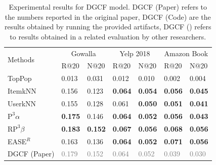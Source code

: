 \documentclass[sigconf,natbib=true,nonacm]{acmart}
\newcommand{\palpha}{\ensuremath{\text{P}^3\!\alpha}\xspace}
\newcommand{\pbeta}{\ensuremath{\text{RP}^3\!\beta}\xspace}
\newcommand{\easer}{EASE$^R$\xspace}
\begin{document}
\begin{table}[htbp]
\addtolength{\tabcolsep}{-0.1em}
    \caption{Experimental results for DGCF model. DGCF (Paper) refers to the numbers reported in the original paper, DGCF (Code) are the results obtained by running the provided artifacts, DGCF (\cite{Anelli2023Myth}) refers to results obtained in a related evaluation by other researchers.}
    \label{tab:tDGCF}
    \centering
    \begin{tabular}{l l l l l l l}

        \multirow{2}{*}{Methods} & \multicolumn{2}{c}{Gowalla}                              & \multicolumn{2}{c}{Yelp 2018}                                 & \multicolumn{2}{c}{Amazon Book} \\

        ~                       & R@20               & N@20                                 & R@20                  & N@20                            & R@20                    & N@20 \\ \hline
        TopPop                  & 0.013              & 0.031                                & 0.012                 & 0.010                           & 0.002                   &   0.004         \\
        ItemkNN                 & 0.156              & 0.123                                & \textbf{0.064}        & \textbf{0.054}                  & \textbf{0.056}          & \textbf{0.045}            \\
        UserkNN                 & 0.155              & 0.128                                &  0.061                & \textbf{0.050}                  & \textbf{0.051}          & \textbf{0.041}             \\
        \palpha                 & \textbf{0.175}     & 0.146                                & \textbf{0.064}        & \textbf{0.052}                  & \textbf{0.056}          & \textbf{0.043}           \\
        \pbeta                  & \textbf{0.183}     & \textbf{0.152}                       & \textbf{0.067}        & \textbf{0.056}                  & \textbf{0.068}          & \textbf{0.056}           \\
        \easer                  & 0.163              & 0.136                                & \textbf{0.064}        & \textbf{0.052}                  &  \textbf{0.071}         &  \textbf{0.056}                \\ \hline
        DGCF (Paper)            & \textcolor{gray}{0.179}            & \textcolor{gray}{0.152}                              & \textcolor{gray}{0.064}             & \textcolor{gray}{0.052}                           & \textcolor{gray}{0.039}                 & \textcolor{gray}{0.030}                 \\

\end{tabular}
\end{table}
\end{document}
